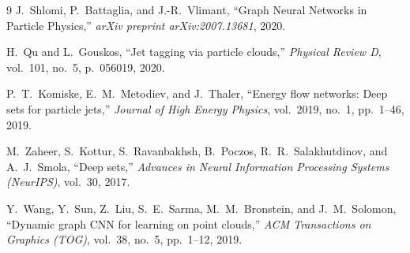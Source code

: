 \documentclass[10pt,twocolumn,letterpaper]{article}
\begin{document}
\begin{thebibliography}{9}
J.~Shlomi, P.~Battaglia, and J.-R.~Vlimant, ``Graph Neural Networks in Particle Physics,'' \emph{arXiv preprint arXiv:2007.13681}, 2020.

H.~Qu and L.~Gouskos, ``Jet tagging via particle clouds,'' \emph{Physical Review D}, vol.~101, no.~5, p.~056019, 2020.

P.~T.~Komiske, E.~M.~Metodiev, and J.~Thaler, ``Energy flow networks: Deep sets for particle jets,'' \emph{Journal of High Energy Physics}, vol.~2019, no.~1, pp.~1--46, 2019.

M.~Zaheer, S.~Kottur, S.~Ravanbakhsh, B.~Poczos, R.~R.~Salakhutdinov, and A.~J.~Smola, ``Deep sets,'' \emph{Advances in Neural Information Processing Systems (NeurIPS)}, vol.~30, 2017.

Y.~Wang, Y.~Sun, Z.~Liu, S.~E.~Sarma, M.~M.~Bronstein, and J.~M.~Solomon, ``Dynamic graph CNN for learning on point clouds,'' \emph{ACM Transactions on Graphics (TOG)}, vol.~38, no.~5, pp.~1--12, 2019.
\end{thebibliography}
\end{document}
